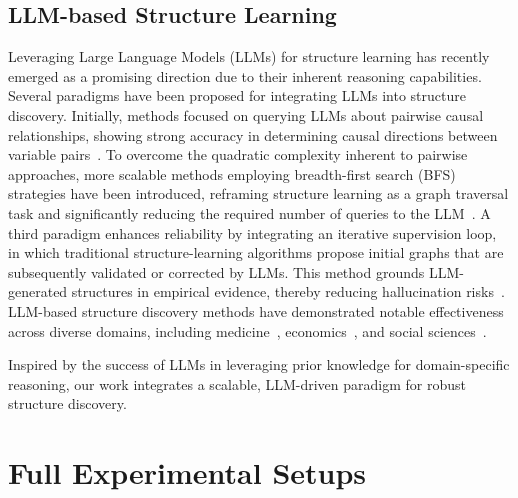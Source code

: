 \subsection{LLM-based Structure Learning}
Leveraging Large Language Models (LLMs) for structure learning has recently emerged as a promising direction due to their inherent reasoning capabilities. Several paradigms have been proposed for integrating LLMs into structure discovery. Initially, methods focused on querying LLMs about pairwise causal relationships, showing strong accuracy in determining causal directions between variable pairs~\cite{kiciman2023causal}. To overcome the quadratic complexity inherent to pairwise approaches, more scalable methods employing breadth-first search (BFS) strategies have been introduced, reframing structure learning as a graph traversal task and significantly reducing the required number of queries to the LLM~\cite{jiralerspong2024efficient, zanna2025fairness}. A third paradigm enhances reliability by integrating an iterative supervision loop, in which traditional structure-learning algorithms propose initial graphs that are subsequently validated or corrected by LLMs. This method grounds LLM-generated structures in empirical evidence, thereby reducing hallucination risks~\cite{ban2023causal}. LLM-based structure discovery methods have demonstrated notable effectiveness across diverse domains, including medicine~\cite{naik2024applying, antonucci2023zero, arsenyan2024large}, economics~\cite{causal4financial}, and social sciences~\cite{manning2024automated}. 

Inspired by the success of LLMs in leveraging prior knowledge for domain-specific reasoning, our work integrates a scalable, LLM-driven paradigm for robust structure discovery.

\section{Full Experimental Setups}


